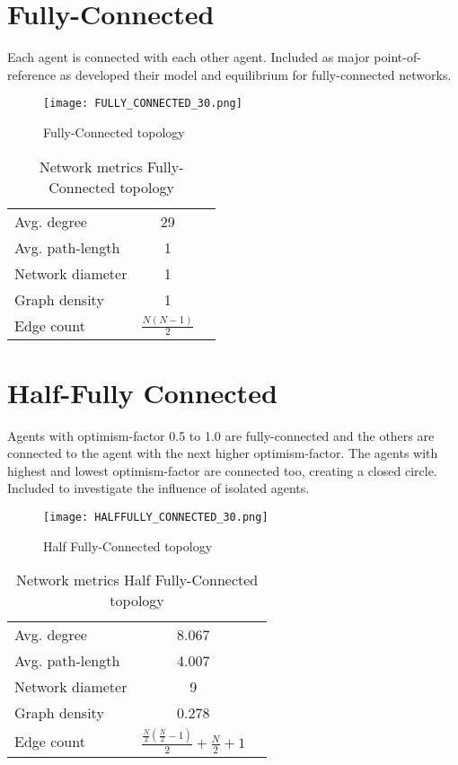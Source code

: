 \documentclass[Bachelorarbeit.tex]{subfiles}
\begin{document}
\section{Fully-Connected}

Each agent is connected with each other agent. Included as major point-of-reference as \cite{Breuer2015} developed their model and equilibrium for fully-connected networks.

\begin{figure}[H]
	\centering
  \texttt{[image: FULLY\_CONNECTED\_30.png]}
	\caption{Fully-Connected topology}
	\label{fig:topology_FULLY_CONNECTED_30}
\end{figure}

\begin{table}[H]
	\centering
	\caption{Network metrics Fully-Connected topology}
	\begin{tabular} { l c r }
		\hline
		Avg. degree & 29 \\
		Avg. path-length & 1 \\
		Network diameter & 1 \\
		Graph density & 1 \\
		Edge count & $\frac{N(N - 1)}{2}$ \\
		\hline
	\end{tabular}
\end{table}

\pagebreak

\section{Half-Fully Connected}
Agents with optimism-factor 0.5 to 1.0 are fully-connected and the others are connected to the agent with the next higher optimism-factor. The agents with highest and lowest optimism-factor are connected too, creating a closed circle. Included to investigate the influence of isolated agents.

\begin{figure}[H]
	\centering
  \texttt{[image: HALFFULLY\_CONNECTED\_30.png]}
	\caption{Half Fully-Connected topology}
	\label{fig:topology_HALFFULLY_CONNECTED_30}
\end{figure}

\begin{table}[H]
	\centering
	\caption{Network metrics Half Fully-Connected topology}
	\begin{tabular} { l c r }
		\hline
		Avg. degree & 8.067 \\
		Avg. path-length & 4.007 \\
		Network diameter & 9 \\
		Graph density & 0.278 \\
		Edge count & $\frac{\frac{N}{2}(\frac{N}{2} - 1)}{2} + \frac{N}{2} + 1$ \\
		\hline
	\end{tabular}
\end{table}
\end{document}
